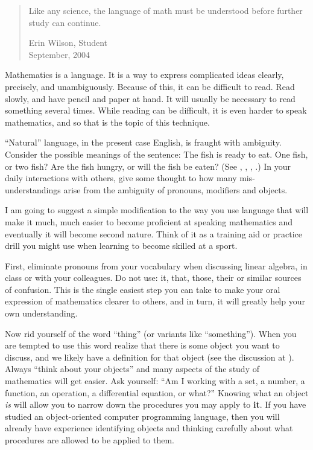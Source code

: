 \begin{quote}
Like any science, the language of math must be understood before further study can continue.
\begin{flushright}
Erin Wilson, Student\\
September, 2004
\end{flushright}
\end{quote}
%
Mathematics is a language.  It is a way to express complicated ideas clearly, precisely, and unambiguously.  Because of this, it can be difficult to read.  Read slowly, and have pencil and paper at hand.  It will usually be necessary to read something several times.  While reading can be difficult, it is even harder to speak mathematics, and so that is the topic of this technique.\par
%
``Natural'' language, in the present case English, is fraught with ambiguity.  Consider the possible meanings of the sentence: The fish is ready to eat.  One fish, or two fish?  Are the fish hungry, or will the fish be eaten?  (See , , , .)  In your daily interactions with others, give some thought to how many mis-understandings arise from the ambiguity of pronouns, modifiers and objects.\par
%
I am going to suggest a simple modification to the way you use language that will make it much, much easier to become proficient at speaking mathematics and eventually it will become second nature.  Think of it as a training aid or practice drill you might use when learning to become skilled at a sport.\par
%
First, eliminate pronouns from your vocabulary when discussing linear algebra, in class or with your colleagues.  Do not use: it, that, those, their or similar sources of confusion.  This is the single easiest step you can take to make your oral expression of mathematics clearer to others, and in turn, it will greatly help your own understanding.\par
%
Now rid yourself of the word ``thing'' (or variants like ``something'').  When you are tempted to use this word realize that there is some object you want to discuss, and we likely have a definition for that object (see the discussion at ).  Always ``think about your objects'' and many aspects of the study of mathematics will get easier.  Ask yourself: ``Am I working with a set, a number, a function, an operation, a differential equation, or what?''  Knowing what an object {\em is} will allow you to narrow down the procedures you may apply to {\bf it}.  If you have studied an object-oriented computer programming language, then you will already have experience identifying objects and thinking carefully about what procedures are allowed to be applied to them.\par
